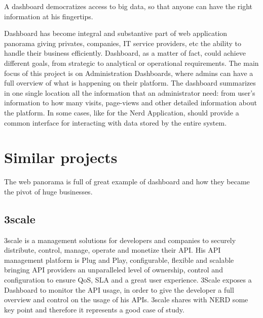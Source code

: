\documentclass[a4paper,13pt]{report}
\begin{document}
A dashboard democratizes access to big data, so that anyone  can have the right information at his fingertips.

Dashboard has become integral and substantive part of web application panorama giving privates, companies, IT service providers, etc the ability to handle their business efficiently. Dashboard, as a matter of fact, could achieve different goals, from strategic to analytical or operational requirements.\newline
The main focus of this project is on Administration Dashboards, where admins can have a full overview of what is happening on their platform. The dashboard summarizes in one single location all the information that an administrator need: from user's information to how many visits, page-views and other detailed information about the platform. In some cases, like for the Nerd Application, should provide a common interface for interacting with data stored by the entire system.

\chapter{Similar projects}

The web panorama is full of great example of dashboard and how they became the pivot of huge businesses.
\section{3scale}
3scale is a management solutions for developers and companies to securely distribute, control, manage, operate and monetize their API. His API management platform is Plug and Play, configurable, flexible and scalable bringing API providers an unparalleled level of ownership, control and configuration to ensure QoS, SLA and a great user experience.
3Scale exposes a Dashboard to monitor the API usage, in order to give the developer a full overview and control on the usage of his APIs.
3scale shares with NERD some key point and therefore it  represents a good case of study.
\end{document}
